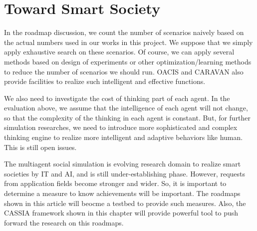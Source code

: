 \section{Toward Smart Society}

In the roadmap discussion, we count the number of scenarios naively
based on the actual numbers used in our works in this project.
We suppose that we simply apply exhaustive search on these scenarios.
Of course, 
we can apply several methods based on design of experiments
or other optimization/learning methods to reduce the number of scenarios
we should run.
OACIS and CARAVAN also provide facilities to
realize such intelligent and effective functions.

We also need to investigate the cost of thinking part of each agent.
In the evaluation above, we assume that the intelligence of each
agent will not change, so that the complexity of the thinking
in each agent is constant.
But, for further simulation researches, we need to introduce
more sophisticated and complex thinking engine to
realize more intelligent and adaptive behaviors like human.
This is still open issues. 

The multiagent social simulation
is evolving research domain to realize smart societies by IT and AI,
and is still under-establishing phase.
However, requests from application fields become stronger and wider.
So, it is important to determine a measure to know achievements will
be important.  
The roadmaps shown in this article will beocme a testbed to provide
such measures.
Also, the CASSIA framework shown in this chapter
will provide powerful tool to push forward the research on this
roadmaps.


